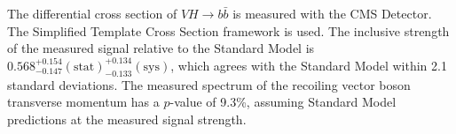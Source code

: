 % 
% 
%
The differential cross section of $V\!H \rightarrow b\bar{b}$ is measured with the CMS Detector.
The Simplified Template Cross Section framework is used.
The inclusive strength of the measured signal relative to the Standard Model is
$0.568^{+0.154}_{-0.147} \mathrm{(stat)}^{+0.134}_{-0.133} \mathrm{(sys)}$,
which agrees with the Standard Model within 2.1 standard deviations.
The measured spectrum of the recoiling vector boson transverse momentum
has a $p$-value of 9.3\%, assuming Standard Model predictions at the measured signal strength.
